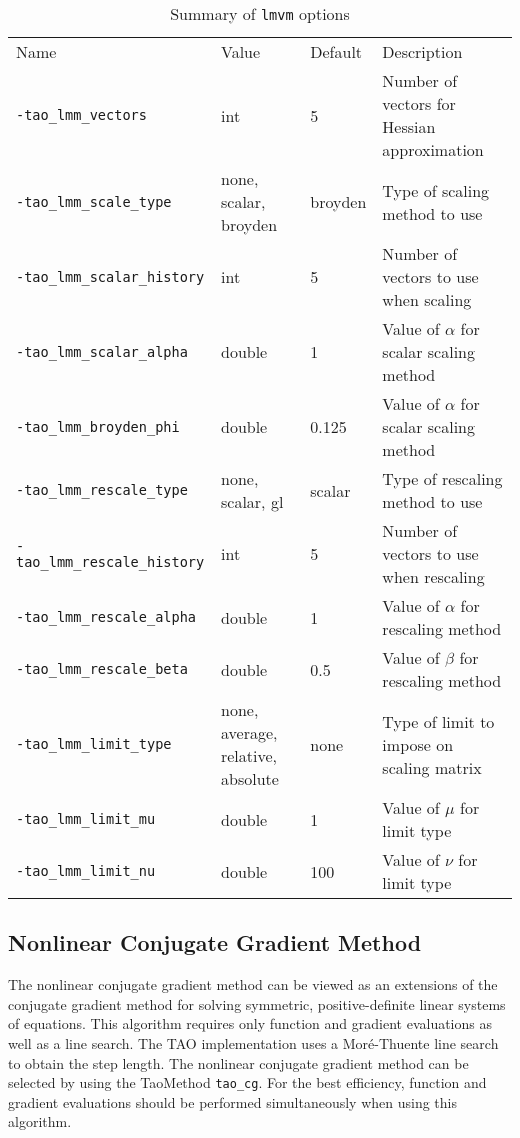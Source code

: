 \begin{table}[h]
\caption{Summary of {\tt lmvm} options}
\begin{tabular}{l|p{1.5in}|l|p{2.0in}}
Name & Value & Default & Description \\
{\tt -tao\_lmm\_vectors} & int & 5 & Number of vectors for Hessian approximation \\
{\tt -tao\_lmm\_scale\_type} & none, scalar, broyden & broyden & Type of scaling method to use \\
{\tt -tao\_lmm\_scalar\_history} & int & 5 & Number of vectors to use when scaling \\
{\tt -tao\_lmm\_scalar\_alpha} & double & 1 & Value of $\alpha$ for scalar scaling method \\
{\tt -tao\_lmm\_broyden\_phi} & double & 0.125 & Value of $\alpha$ for scalar scaling method \\
{\tt -tao\_lmm\_rescale\_type} & none, scalar, gl & scalar & Type of rescaling method to use \\
{\tt -tao\_lmm\_rescale\_history} & int & 5 & Number of vectors to use when rescaling \\
{\tt -tao\_lmm\_rescale\_alpha} & double & 1 & Value of $\alpha$ for rescaling method \\
{\tt -tao\_lmm\_rescale\_beta} & double & 0.5 & Value of $\beta$ for rescaling method \\
{\tt -tao\_lmm\_limit\_type} & none, average, relative, absolute & none & Type of limit to impose on scaling matrix \\
{\tt -tao\_lmm\_limit\_mu} & double & 1 & Value of $\mu$ for limit type\\
{\tt -tao\_lmm\_limit\_nu} & double & 100 & Value of $\nu$ for limit type\\
\end{tabular}
\end{table}

\subsection{Nonlinear Conjugate Gradient Method}

The nonlinear conjugate gradient method can be viewed as an extensions of the 
conjugate gradient method for solving symmetric, positive-definite linear 
systems of equations.  This algorithm requires only function and gradient 
evaluations as well as a line search.  The TAO implementation uses a 
Mor\'{e}-Thuente line search to obtain the step length.  The nonlinear 
conjugate gradient method can be selected by using the TaoMethod 
{\tt tao\_cg}.  For the best efficiency, function and gradient evaluations 
should be performed simultaneously when using this algorithm.

